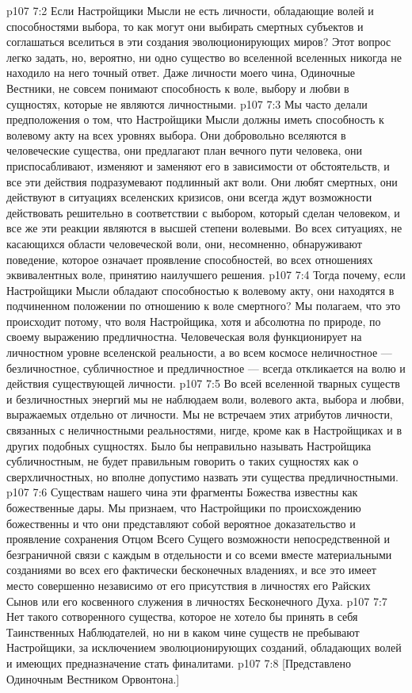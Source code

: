 \vs p107 7:2 Если Настройщики Мысли не есть личности, обладающие волей и способностями выбора, то как могут они выбирать смертных субъектов и соглашаться вселиться в эти создания эволюционирующих миров? Этот вопрос легко задать, но, вероятно, ни одно существо во вселенной вселенных никогда не находило на него точный ответ. Даже личности моего чина, Одиночные Вестники, не совсем понимают способность к воле, выбору и любви в сущностях, которые не являются личностными.
\vs p107 7:3 Мы часто делали предположения о том, что Настройщики Мысли должны иметь способность к волевому акту на всех  уровнях выбора. Они добровольно вселяются в человеческие существа, они предлагают план вечного пути человека, они приспосабливают, изменяют и заменяют его в зависимости от обстоятельств, и все эти действия подразумевают подлинный акт воли. Они любят смертных, они действуют в ситуациях вселенских кризисов, они всегда ждут возможности действовать решительно в соответствии с выбором, который сделан человеком, и все же эти реакции являются в высшей степени волевыми. Во всех ситуациях, не касающихся области человеческой воли, они, несомненно, обнаруживают поведение, которое означает проявление способностей, во всех отношениях эквивалентных воле, принятию наилучшего решения.
\vs p107 7:4 Тогда почему, если Настройщики Мысли обладают способностью к волевому акту, они находятся в подчиненном положении по отношению к воле смертного? Мы полагаем, что это происходит потому, что воля Настройщика, хотя и абсолютна по природе, по своему выражению предличностна. Человеческая воля функционирует на личностном уровне вселенской реальности, а во всем космосе неличностное --- безличностное, субличностное и предличностное --- всегда откликается на волю и действия существующей личности.
\vs p107 7:5 Во всей вселенной тварных существ и безличностных энергий мы не наблюдаем воли, волевого акта, выбора и любви, выражаемых отдельно от личности. Мы не встречаем этих атрибутов личности, связанных с неличностными реальностями, нигде, кроме как в Настройщиках и в других подобных сущностях. Было бы неправильно называть Настройщика субличностным, не будет правильным говорить о таких сущностях как о сверхличностных, но вполне допустимо назвать эти существа предличностными.
\vs p107 7:6 \pc Существам нашего чина эти фрагменты Божества известны как божественные дары. Мы признаем, что Настройщики по происхождению божественны и что они представляют собой вероятное доказательство и проявление сохранения Отцом Всего Сущего возможности непосредственной и безграничной связи с каждым в отдельности и со всеми вместе материальными созданиями во всех его фактически бесконечных владениях, и все это имеет место совершенно независимо от его присутствия в личностях его Райских Сынов или его косвенного служения в личностях Бесконечного Духа.
\vs p107 7:7 Нет такого сотворенного существа, которое не хотело бы принять в себя Таинственных Наблюдателей, но ни в каком чине существ не пребывают Настройщики, за исключением эволюционирующих созданий, обладающих волей и имеющих предназначение стать финалитами.
\vsetoff
\vs p107 7:8 [Представлено Одиночным Вестником Орвонтона.]
